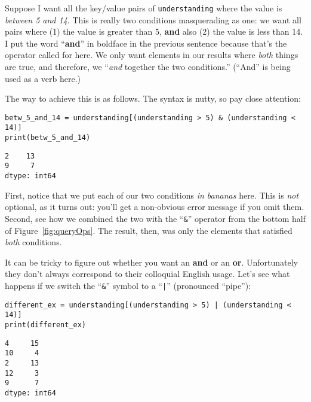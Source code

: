
Suppose I want all the key/value pairs of \texttt{understanding} where the
value is \textit{between 5 and 14}. This is really two conditions masquerading
as one: we want all pairs where (1) the value is greater than 5, \textbf{and}
also (2) the value is less than 14. I put the word ``\textbf{and}'' in boldface
in the previous sentence because that's the operator called for here. We only
want elements in our results where \textit{both} things are true, and
therefore, we ``\textit{and} together the two conditions.'' (``And'' is being
used as a verb here.)

The way to achieve this is as follows. The syntax is nutty, so pay close
attention:

\begin{Verbatim}[fontsize=\small,samepage=true,frame=single,framesep=3mm]
betw_5_and_14 = understanding[(understanding > 5) & (understanding < 14)]
print(betw_5_and_14)
\end{Verbatim}

\begin{Verbatim}[fontsize=\small,samepage=true,frame=leftline,framesep=5mm,framerule=1mm]
2    13
9     7
dtype: int64
\end{Verbatim}

First, notice that we put each of our two conditions \textit{in bananas} here.
This is \textit{not} optional, as it turns out: you'll get a non-obvious error
message if you omit them. Second, see how we combined the two with the
``\texttt{\&}'' operator from the bottom half of Figure~\ref{fig:queryOps}. The
result, then, was only the elements that satisfied \textit{both} conditions.


It can be tricky to figure out whether you want an \textbf{and} or an
\textbf{or}. Unfortunately they don't always correspond to their colloquial
English usage. Let's see what happens if we switch the ``\texttt{\&}'' symbol to
a ``\texttt{|}'' (pronounced ``pipe''):

\begin{Verbatim}[fontsize=\small,samepage=true,frame=single,framesep=3mm]
different_ex = understanding[(understanding > 5) | (understanding < 14)]
print(different_ex)
\end{Verbatim}

\begin{Verbatim}[fontsize=\small,samepage=true,frame=leftline,framesep=5mm,framerule=1mm]
4     15
10     4
2     13
12     3
9      7
dtype: int64
\end{Verbatim}

